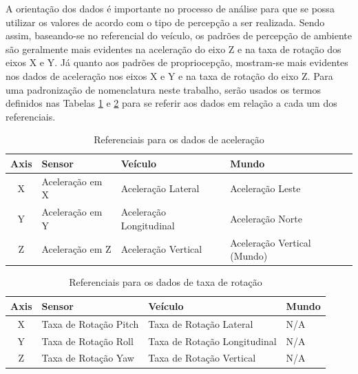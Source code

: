 A orientação dos dados é importante no processo de análise para que se possa utilizar os valores de acordo com o tipo de percepção a ser realizada. Sendo assim, baseando-se no referencial do veículo, os padrões de percepção de ambiente são geralmente mais evidentes na aceleração do eixo Z e na taxa de rotação dos eixos X e Y. Já quanto aos padrões de propriocepção, mostram-se mais evidentes nos dados de aceleração nos eixos X e Y e na taxa de rotação do eixo Z. Para uma padronização de nomenclatura neste trabalho, serão usados os termos definidos nas Tabelas \ref{table:accelerometer_reference_frames} e \ref{table:gyroscope_reference_frames} para se referir aos dados em relação a cada um dos referenciais.

\begin{table}[h]
    \caption{Referenciais para os dados de aceleração}
    \label{table:accelerometer_reference_frames}
    \centering
    \small
    \begin{tabular}{clll}
        \toprule
        \textbf{Axis} & \textbf{Sensor} & \textbf{Veículo} & \textbf{Mundo} \\
        \toprule
        X & Aceleração em X & Aceleração Lateral & Aceleração Leste \\
        \midrule
        Y & Aceleração em Y & Aceleração Longitudinal & Aceleração Norte \\
        \midrule
        Z & Aceleração em Z & Aceleração Vertical & Aceleração Vertical (Mundo) \\
        \bottomrule
    \end{tabular}
\end{table}

\begin{table}[h]
    \caption{Referenciais para os dados de taxa de rotação}
    \label{table:gyroscope_reference_frames}
    \centering
    \small
    \begin{tabular}{clll}
        \toprule
        \textbf{Axis} & \textbf{Sensor} & \textbf{Veículo} & \textbf{Mundo} \\
        \toprule
        X & Taxa de Rotação Pitch & Taxa de Rotação Lateral & N/A \\
        \midrule
        Y & Taxa de Rotação Roll & Taxa de Rotação Longitudinal & N/A \\
        \midrule
        Z & Taxa de Rotação Yaw & Taxa de Rotação Vertical & N/A \\
        \bottomrule
    \end{tabular}
\end{table}

